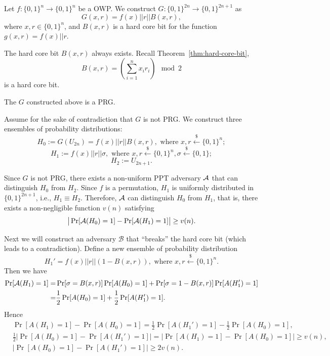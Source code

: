 \begin{construction}
Let $f: \{0, 1\}^n \rightarrow \{0, 1\}^n$ be a OWP. We construct $G: \{0, 1\}^{2n} \rightarrow \{0, 1\}^{2n+1}$ as
\[
G(x, r) = f(x) || r || B(x, r),
\]
where $x, r \in \{0, 1\}^n$, and $B(x, r)$ is a hard core bit for the function $g(x,r) = f(x) || r$.
\end{construction}

\begin{remark}
The hard core bit $B(x,r)$ always exists. Recall Theorem~\ref{thm:hard-core-bit},
\[B(x,r) = \left(\sum_{i=1}^n x_i r_i\right)\mod 2\]
is a hard core bit.
\end{remark}

\begin{theorem}
The $G$ constructed above is a PRG.
\end{theorem}

\proof
Assume for the sake of contradiction that $G$ is not PRG.
We construct three ensembles of probability distributions:
\[H_0 := G(U_{2n}) = f(x) || r || B(x, r), \text{ where } x, r \xleftarrow{\$} \{0, 1\}^n;\]
\[H_1 := f(x) || r || \sigma, \text{ where } x, r \xleftarrow{\$} \{0, 1\}^n, \sigma \xleftarrow{\$} \{0, 1\};\]
\[H_2 := U_{2n+1}.\]

Since $G$ is not PRG, there exists a non-uniform PPT adversary ${\mathcal A}$ that can distinguish $H_0$ from $H_2$.
Since $f$ is a permutation, $H_1$ is uniformly distributed in $\{0, 1\}^{2n+1}$, i.e., $H_1 \equiv H_2$.
Therefore, ${\mathcal A}$ can distinguish $H_0$ from $H_1$,
that is, there exists a non-negligible function $v(n)$ satisfying
\[
\big| \Pr[{\mathcal A}(H_0)=1] - \Pr[{\mathcal A}(H_1)=1] \big| \geq v(n).
\]

Next we will construct an adversary $\mathcal{B}$ that ``breaks'' the hard core bit (which leads to a contradiction).
Define a new ensemble of probability distribution
\[
H_1' = f(x) || r || (1-B(x, r)) , \text{ where } x, r \xleftarrow{\$} \{0, 1\}^n.
\]
Then we have
\begin{align*}
\Pr[{\mathcal A}(H_1) = 1]
=& \Pr[\sigma = B(x, r)] \Pr[A(H_0) = 1] + \Pr[\sigma = 1 - B(x, r)] \Pr[A(H_1') = 1]\\
=& \frac{1}{2} \Pr[A(H_0) = 1] + \frac{1}{2}\Pr[A(H_1') = 1].
\end{align*}
Hence
\begin{align*}
&\Pr[A(H_1) = 1] - \Pr[A(H_0) = 1]
=  \frac{1}{2}\Pr[A(H_1') = 1] - \frac{1}{2} \Pr[A(H_0) = 1],
\\
&\frac{1}{2} \left|\Pr[A(H_0) = 1] - \Pr[A(H_1') = 1] \right|
= \left| \Pr[A(H_1) = 1] - \Pr[A(H_0) = 1] \right|
\geq v(n),
\\
&\left|\Pr[A(H_0) = 1] - \Pr[A(H_1') = 1] \right|
\geq 2v(n).
\end{align*}

